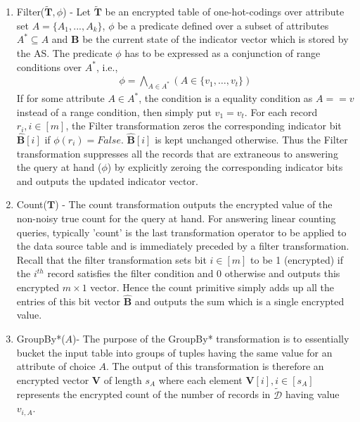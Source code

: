 \begin{enumerate}
  \item Filter($\tilde{\mathbf{T}},\phi$) - Let $\tilde{\mathbf{T}}$ be an encrypted table of one-hot-codings over attribute set $A=\{A_1,...,A_k\}$, $\phi$ be a  predicate defined over a subset of attributes $A^*\subseteq A$ and $\mathbf{B}$ be the current state of the indicator vector which is stored by the AS. The predicate $\phi$ has to be expressed as a conjunction of range conditions over $A^*$, i.e.,\begin{gather}\phi = \bigwedge_{A \in A^*}(A \in \{v_{1},\ldots,v_{t}\} ) \label{phi} \end{gather} If for some attribute $A \in A^*$, the condition is a equality condition as $A==v$ instead of a range condition, then simply put $v_1=v_t$. For each record $r_i, i \in [m]$, the Filter transformation zeros the corresponding indicator bit $\hat{\mathbf{B}}[i] $ if $\phi(r_i)=False$. $\hat{\mathbf{B}}[i] $ is kept unchanged otherwise. Thus the Filter transformation suppresses all the records that are extraneous to answering the query at hand ($\phi$) by explicitly zeroing the corresponding indicator bits and outputs the updated indicator vector. %
    \item{Count($\mathbf{T}$) }- The count transformation outputs the encrypted value of the non-noisy true count for the query at hand. For answering linear counting queries, typically 'count'  is the last transformation operator to be applied to the data source table and is immediately preceded by a filter transformation. Recall that the filter transformation sets bit $i \in [m]$ to be 1 (encrypted) if the $i^{th}$ record satisfies the filter condition and 0 otherwise and outputs this encrypted $m\times 1$ vector. Hence the count primitive simply adds up all the entries of this bit vector $\hat{\mathbf{B}}$ and  outputs the sum which is a single encrypted value. 
    \item{GroupBy*($A$)}- The purpose of the GroupBy* transformation is to essentially bucket the input table into groups of tuples having the same value for an attribute of choice $A$. The output of this transformation is therefore an encrypted vector $\mathbf{V}$ of length $s_A$ where each  element $\mathbf{V}[i], i \in [s_A]$ represents the encrypted count of the number of records in $\boldsymbol{\tilde{\mathcal{D}}}$ having value $v_{i,A}$.

\end{enumerate}
